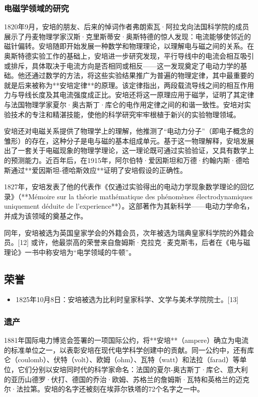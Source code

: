 \subsubsection{电磁学领域的研究}
1820年9月，安培的朋友、后来的悼词作者弗朗索瓦·阿拉戈向法国科学院的成员展示了丹麦物理学家汉斯·克里斯蒂安·奥斯特德的惊人发现：电流能够使邻近的磁针偏转。安培随即开始发展一种数学和物理理论，以理解电与磁之间的关系。在奥斯特德实验工作的基础上，安培进一步研究发现，平行导线中的电流会相互吸引或排斥，具体取决于电流方向是否相同或相反——这一发现奠定了电动力学的基础。他还通过数学的方法，将这些实验结果推广为普遍的物理定律，其中最重要的就是后来被称为**安培定律**的原理。该定律指出，两段载流导线之间的相互作用力与导线长度及其电流强度成正比。安培还将这一原理应用于磁学，证明了其定律与法国物理学家夏尔·奥古斯丁·库仑的电作用定律之间的和谐一致性。安培对实验技术的专注和精湛技能，使他的科学研究牢牢根植于新兴的实验物理领域。

安培还对电磁关系提供了物理学上的理解，他推测了“电动力分子”（即电子概念的雏形）的存在，这种分子是电与磁的基本组成单元。基于这一物理解释，安培发展出了一套关于电磁现象的物理学理论，这一理论既可通过实验验证，又具有数学上的预测能力。近百年后，在1915年，阿尔伯特·爱因斯坦和万德·约翰内斯·德哈斯通过**爱因斯坦-德哈斯效应**证明了安培假设的正确性。

1827年，安培发表了他的代表作《仅通过实验得出的电动力学现象数学理论的回忆录》（**Mémoire sur la théorie mathématique des phénomènes électrodynamiques uniquement déduite de l'experience**）。这部著作为其新科学——电动力学命名，并成为该领域的奠基之作。

同年，安培被选为英国皇家学会的外籍会员，次年被选为瑞典皇家科学院的外籍会员。[12] 或许，他最崇高的荣誉来自詹姆斯·克拉克·麦克斯韦，后者在《电与磁理论》一书中称安培为“电学领域的牛顿”。
\subsection{荣誉}
\begin{itemize}
\item 1825年10月8日：安培被选为比利时皇家科学、文学与美术学院院士。[13]
\end{itemize}
\subsubsection{遗产}
1881年国际电力博览会签署的一项国际公约，将**安培**（ampere）确立为电流的标准单位之一，以表彰安培在现代电学科学创建中的贡献。同一公约中，还有库仑（coulomb）、伏特（volt）、欧姆（ohm）、瓦特（watt）和法拉（farad）等单位，它们分别以安培同时代的科学家命名：法国的夏尔-奥古斯丁·库仑、意大利的亚历山德罗·伏打、德国的乔治·欧姆、苏格兰的詹姆斯·瓦特和英格兰的迈克尔·法拉第。安培的名字还被刻在埃菲尔铁塔的72个名字之一中。

